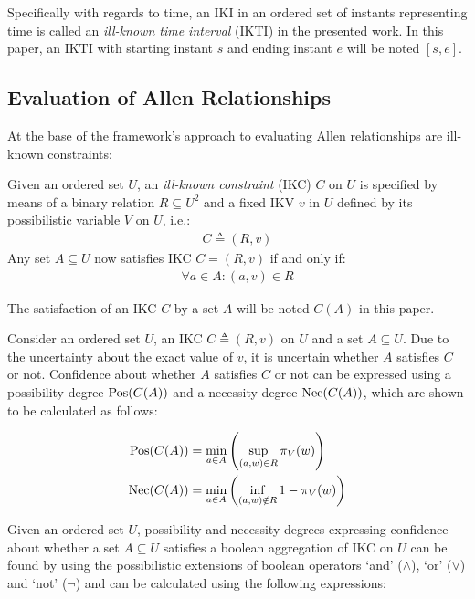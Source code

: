 Specifically with regards to time, an IKI in an ordered set of instants representing time is called an \emph{ill-known time interval} (IKTI) in the presented work. In this paper, an IKTI with starting instant $s$ and ending instant $e$ will be noted $\left[s, e\right]$.

\subsection{\label{subsec:ikc-evaluation}Evaluation of Allen Relationships}
At the base of the framework's approach to evaluating Allen relationships are ill-known constraints:

\begin{definition}
Given an ordered set $U$, an \emph{ill-known constraint} (IKC) $C$ on $U$ is specified by means of a binary relation $R \subseteq U^{2}$ and a fixed IKV $v$ in $U$ defined by its possibilistic variable $V$ on $U$, i.e.:
\begin{align}
C \triangleq (R,v) \nonumber
\end{align}
Any set $A \subseteq U$ now satisfies IKC $C = (R,v)$ if and only if:
\begin{align}
\forall a \in A : (a,v) \in R \nonumber
\end{align}
\end{definition}

The satisfaction of an IKC $C$ by a set $A$ will be noted $C(A)$ in this paper. 

Consider an ordered set $U$, an IKC $C \triangleq (R,v)$ on $U$ and a set $A \subseteq U$. Due to the uncertainty about the exact value of $v$, it is uncertain whether $A$ satisfies $C$ or not. Confidence about whether $A$ satisfies $C$ or not can be expressed using a possibility degree $\operatorname{Pos}(C(A))$ and a necessity degree $\operatorname{Nec}(C(A))$, which are shown to be calculated as follows:

\begin{align}
\operatorname{Pos}(C(A)) & = \min_{a \in A}\left(\sup_{(a,w) \in R}\pi_{V}(w)\right) \label{ill-known-pos}\\
\operatorname{Nec}(C(A)) & = \min_{a \in A}\left(\inf_{(a,w) \notin R} 1-\pi_{V}(w)\right) \label{ill-known-nec}
\end{align}

Given an ordered set $U$, possibility and necessity degrees expressing confidence about whether a set $A \subseteq U$ satisfies a boolean aggregation of IKC on $U$ can be found by using the possibilistic extensions of boolean operators `and' ($\wedge$), `or' ($\vee$) and `not' ($\neg$) and can be calculated using the following expressions:

